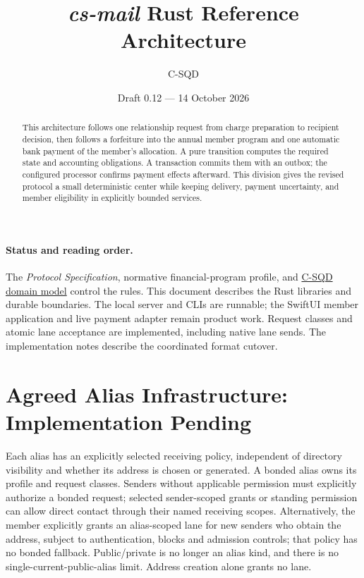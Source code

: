 \documentclass[11pt]{article}
\title{\textit{cs-mail} Rust Reference Architecture}
\author{C-SQD}
\date{Draft 0.12 --- 14 October 2026}
\begin{document}
\maketitle

\begin{abstract}
This architecture follows one relationship request from charge preparation to
recipient decision, then follows a forfeiture into the annual member program and
one automatic bank payment of the member's allocation.
A pure transition computes the required state and accounting obligations. A
transaction commits them with an outbox; the configured processor confirms payment
effects afterward. This division gives the revised protocol a small deterministic
center while keeping delivery, payment uncertainty, and member eligibility in
explicitly bounded services.
\end{abstract}

\medskip\noindent{}\medskip

\paragraph{Status and reading order.}
The \textit{Protocol Specification}, normative financial-program profile, and
\href{DOMAIN_MODEL.md}{C-SQD domain model} control the rules. This document
describes the Rust libraries and durable boundaries. The local server and CLIs
are runnable; the SwiftUI member application and live payment adapter remain
product work. Request classes and atomic lane acceptance are implemented,
including native lane sends.
The implementation notes describe the coordinated format cutover.

\section{Agreed Alias Infrastructure: Implementation Pending}

Each alias has an explicitly selected receiving policy, independent of directory
visibility and whether its address is chosen or generated. A bonded alias owns its
profile and request classes. Senders without applicable permission must explicitly
authorize a bonded request; selected sender-scoped grants or standing permission
can allow direct contact through their named receiving scopes. Alternatively,
the member explicitly grants an alias-scoped lane for new senders who obtain the
address, subject to authentication, blocks and admission controls; that policy has
no bonded fallback. Public/private is no longer an alias kind, and there is no
single-current-public-alias limit. Address creation alone grants no lane.
\end{document}
